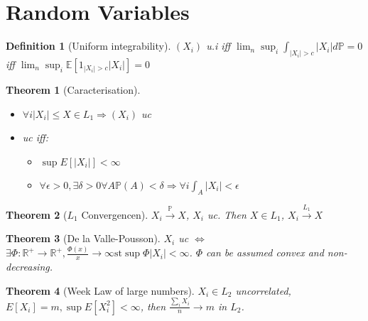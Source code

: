 \documentclass{article}
\newtheorem{theorem}{Theorem}
\newtheorem{definition}{Definition}
\begin{document}
\section{Random Variables}
\begin{definition}[Uniform integrability]
  $(X_i)$ u.i iff $\lim_n \sup_i \int_{|X_i| > c} |X_i|d\mathbb P = 0$
  iff $\lim_n \sup_i \mathbb E[1_{|X_i| > c}|X_i|]  = 0$
\end{definition}
\begin{theorem}[Caracterisation]
  \begin{itemize}
  \item $\forall i |X_i| \le X \in L_1 \Rightarrow (X_i)$ uc
  \item uc iff:
    \begin{itemize}
    \item $\sup E[|X_i|] < \infty$
    \item $\forall \epsilon > 0, \exists \delta > 0 \forall A \mathbb P(A) < \delta \Rightarrow  \forall i \int_A |X_i| < \epsilon$
    \end{itemize}
  \end{itemize}
\end{theorem}
\begin{theorem}[$L_1$ Convergencen]
  $X_i \overset{\mathbb P}{\rightarrow} X$, $X_i$ uc. Then $X \in L_1$, $X_i \overset{L_1}{\rightarrow} X$
  
\end{theorem}
\begin{theorem}[De la Valle-Pousson]
  $X_i$ uc $\iff$ $\exists \Phi: \mathbb R^+ \rightarrow \mathbb R^+,\frac{\Phi(x)}{x}\rightarrow \infty \text{st} \sup \Phi |X_i| < \infty$.
  $\Phi$ can be assumed convex and non-decreasing.
\end{theorem}

\begin{theorem}[Week Law of large numbers]
  $X_i \in L_2$ uncorrelated, $E[X_i] = m, \sup E[X_i^2] < \infty$, then $\frac{\sum_i X_i}{n} \rightarrow m$ in $L_2$.
\end{theorem}
\end{document}
